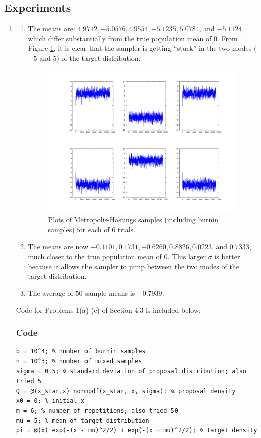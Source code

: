 \documentclass[11pt]{article}
\begin{document}
\subsection{Experiments}
\begin{enumerate}
\item
\begin{enumerate}
\item The means are: $4.9712, -5.0576, 4.9554, -5.1235, 5.0784$, and $-5.1124$,
which differ substantially from the true population mean of $0$. From Figure
\ref{fig:431a}, it is clear that the sampler is getting ``stuck'' in the two
modes ($-5$ and $5$) of the target distribution.
\begin{figure}[h!]
\centering
\quad\;
\includegraphics[trim=18mm 0mm 18mm 0mm, clip=true, width=\linewidth]{431a}
\vspace{-6mm}
\caption{Plots of Metropolis-Hastings samples (including burnin samples) for
each of $6$ trials.}
\label{fig:431a}
\end{figure}
\item The means are now $-0.1101, 0.1731, -0.6260, 0.8826, 0.0223$, and
$0.7333$, much closer to the true population mean of $0$. This larger $\sigma$
is better because it allows the sampler to jump between the two modes of the
target distribution.
\item The average of $50$ sample means is $-0.7939$.
\end{enumerate}
Code for Problems 1(a)-(c) of Section 4.3 is included below:
\subsubsection*{Code}
\begin{verbatim}
b = 10^4; % number of burnin samples
n = 10^3; % number of mixed samples
sigma = 0.5; % standard deviation of proposal distribution; also tried 5
Q = @(x_star,x) normpdf(x_star, x, sigma); % proposal density
x0 = 0; % initial x
m = 6; % number of repetitions; also tried 50
mu = 5; % mean of target distribution
pi = @(x) exp(-(x - mu)^2/2) + exp(-(x + mu)^2/2); % target density


\end{verbatim}
\end{enumerate}
\end{document}
